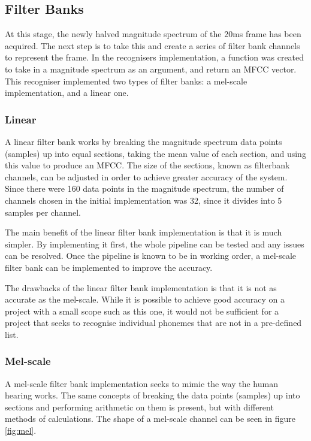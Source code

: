 \documentclass[journal]{IEEEtran}
\begin{document}
\subsection{Filter Banks}
At this stage, the newly halved magnitude spectrum of the 20ms frame has been acquired. The next step is to take this and create a series of filter bank channels to represent the frame. In the recognisers implementation, a function was created to take in a magnitude spectrum as an argument, and return an MFCC vector. This recogniser implemented two types of filter banks: a {\selectfont mel-scale} implementation, and a {\selectfont linear} one.\\

\subsubsection{Linear}
A linear filter bank works by breaking the magnitude spectrum data points (samples) up into equal sections, taking the mean value of each section, and using this value to produce an {\selectfont MFCC}. The size of the sections, known as filterbank channels, can be adjusted in order to achieve greater accuracy of the system. Since there were 160 data points in the magnitude spectrum, the number of channels chosen in the initial implementation was 32, since it divides into 5 samples per channel.

The main benefit of the linear filter bank implementation is that it is much simpler. By implementing it first, the whole pipeline can be tested and any issues can be resolved. Once the pipeline is known to be in working order, a mel-scale filter bank can be implemented to improve the accuracy.

The drawbacks of the linear filter bank implementation is that it is not as accurate as the mel-scale. While it is possible to achieve good accuracy on a project with a small scope such as this one, it would not be sufficient for a project that seeks to recognise individual phonemes that are not in a pre-defined list. \\

\subsubsection{Mel-scale}
A mel-scale filter bank implementation seeks to mimic the way the human hearing works. The same concepts of breaking the data points (samples) up into sections and performing arithmetic on them is present, but with different methods of calculations. The shape of a mel-scale channel can be seen in figure \ref{fig:mel}.
\end{document}
